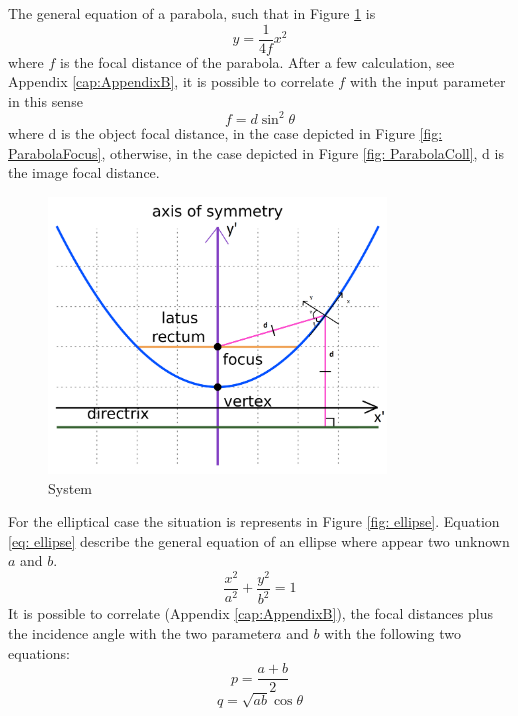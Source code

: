 The general equation of a parabola, such that in  Figure \ref{fig: ParabolaSystem} is
%
\begin{equation}
y = \frac{1}{4f} x^2
\label{eq: parabola}
\end{equation}
%
where $f $ is the focal distance of the parabola. After a few calculation, see Appendix \ref{cap:AppendixB}, it is possible to correlate $f $ with the input parameter in this sense
%
\begin{equation}
f = d \sin^2 \theta
\label{eq: parabola2}
\end{equation}
%
where d is the object focal distance, in the case depicted in Figure \ref{fig: ParabolaFocus}, otherwise, in the case depicted in Figure \ref{fig: ParabolaColl}, d is the image focal distance.
%
\begin{figure}[H]
%
\centering
%
\includegraphics[width=0.8\textwidth]{Immagini/Chapter3/Parab}
%
\caption{System}
%
\label{fig: ParabolaSystem}
%
\end{figure}
For the elliptical case the situation is represents in Figure \ref{fig: ellipse}. Equation \ref{eq: ellipse} describe the general equation of an ellipse where appear two unknown $a$ and $b $.
%
\begin{equation}
\frac{x^2}{a^2} + \frac{y^2}{b^2} = 1
\label{eq: ellipse}
\end{equation}
%
It is possible to correlate (Appendix \ref{cap:AppendixB}), the focal distances plus the incidence angle with the two parameter$a$ and $b $ with the following two equations:
%
\begin{equation}
p = \frac{a + b}{2}
\label{eq: 1stEllipseEq}
\end{equation}
%
\begin{equation}
q = \sqrt{ab} \cos\theta
\label{eq: 2ndEllipseEq}
\end{equation}
